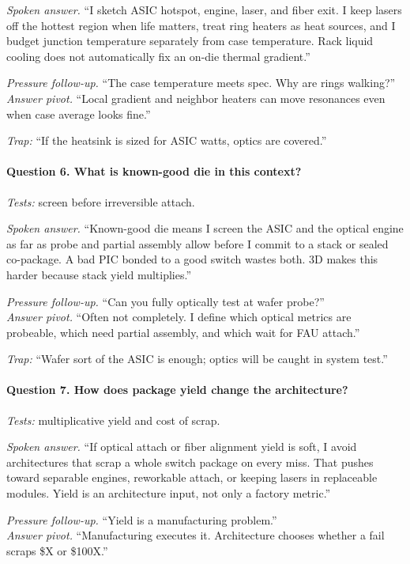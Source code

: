 \textit{Spoken answer.}
``I sketch ASIC hotspot, engine, laser, and fiber exit. I keep lasers off the
hottest region when life matters, treat ring heaters as heat sources, and I
budget junction temperature separately from case temperature. Rack liquid
cooling does not automatically fix an on-die thermal gradient.''

\textit{Pressure follow-up.} ``The case temperature meets spec. Why are rings
walking?''\\
\textit{Answer pivot.} ``Local gradient and neighbor heaters can move
resonances even when case average looks fine.''

\textit{Trap:} ``If the heatsink is sized for ASIC watts, optics are covered.''

\paragraph{Question 6. What is known-good die in this context?}
\textit{Tests:} screen before irreversible attach.

\textit{Spoken answer.}
``Known-good die means I screen the ASIC and the optical engine as far as
probe and partial assembly allow before I commit to a stack or sealed
co-package. A bad PIC bonded to a good switch wastes both. 3D makes this
harder because stack yield multiplies.''

\textit{Pressure follow-up.} ``Can you fully optically test at wafer probe?''\\
\textit{Answer pivot.} ``Often not completely. I define which optical metrics
are probeable, which need partial assembly, and which wait for FAU attach.''

\textit{Trap:} ``Wafer sort of the ASIC is enough; optics will be caught in
system test.''

\paragraph{Question 7. How does package yield change the architecture?}
\textit{Tests:} multiplicative yield and cost of scrap.

\textit{Spoken answer.}
``If optical attach or fiber alignment yield is soft, I avoid architectures
that scrap a whole switch package on every miss. That pushes toward separable
engines, reworkable attach, or keeping lasers in replaceable modules. Yield
is an architecture input, not only a factory metric.''

\textit{Pressure follow-up.} ``Yield is a manufacturing problem.''\\
\textit{Answer pivot.} ``Manufacturing executes it. Architecture chooses
whether a fail scraps \$X or \$100X.''

